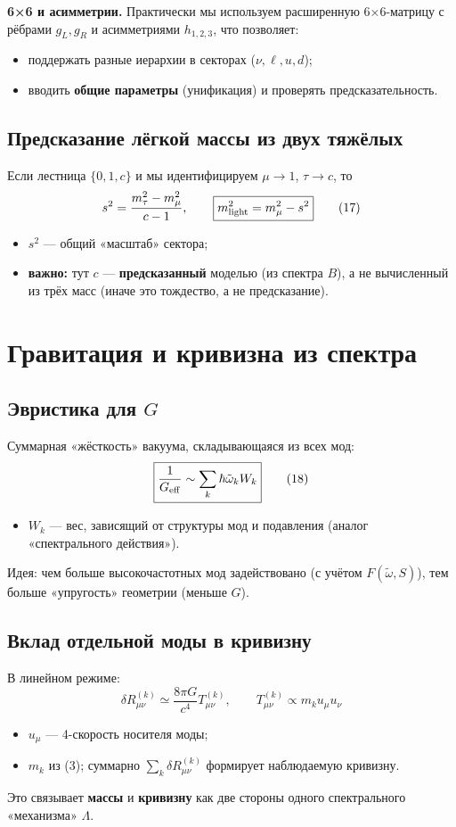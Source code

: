 \documentclass[12pt,a4paper]{article}
\begin{document}
\textbf{6×6 и асимметрии.} Практически мы используем расширенную 6×6-матрицу с рёбрами \(g_L, g_R\) и асимметриями \(h_{1,2,3}\), что позволяет:
\begin{itemize}
    \item поддержать разные иерархии в секторах (\(\nu, \ell, u, d\));
    \item вводить \textbf{общие параметры} (унификация) и проверять предсказательность.
\end{itemize}

\subsection{Предсказание лёгкой массы из двух тяжёлых}
Если лестница \(\{0, 1, c\}\) и мы идентифицируем \(\mu \to 1\), \(\tau \to c\), то
\[
s^2 = \frac{m_\tau^2 - m_\mu^2}{c - 1}, \qquad
\boxed{m_{\rm light}^2 = m_\mu^2 - s^2} \tag{17}
\]
\begin{itemize}
    \item \(s^2\) — общий «масштаб» сектора;
    \item \textbf{важно:} тут \(c\) — \textbf{предсказанный} моделью (из спектра \(B\)), а не вычисленный из трёх масс (иначе это тождество, а не предсказание).
\end{itemize}

\section{Гравитация и кривизна из спектра}

\subsection{Эвристика для \(G\)}
Суммарная «жёсткость» вакуума, складывающаяся из всех мод:
\[
\boxed{\frac{1}{G_{\rm eff}} \sim \sum_k \hbar \tilde{\omega}_k W_k} \tag{18}
\]
\begin{itemize}
    \item \(W_k\) — вес, зависящий от структуры мод и подавления (аналог «спектрального действия»).
\end{itemize}
Идея: чем больше высокочастотных мод задействовано (с учётом \(F(\tilde{\omega}, S)\)), тем больше «упругость» геометрии (меньше \(G\)).

\subsection{Вклад отдельной моды в кривизну}
В линейном режиме:
\[
\boxed{
\delta R_{\mu\nu}^{(k)} \simeq \frac{8\pi G}{c^4} T_{\mu\nu}^{(k)}, \qquad
T_{\mu\nu}^{(k)} \propto m_k u_\mu u_\nu
} \tag{19}
\]
\begin{itemize}
    \item \(u_\mu\) — 4-скорость носителя моды;
    \item \(m_k\) из (3); суммарно \(\sum_k \delta R_{\mu\nu}^{(k)}\) формирует наблюдаемую кривизну.
\end{itemize}
Это связывает \textbf{массы} и \textbf{кривизну} как две стороны одного спектрального «механизма» \(\Lambda\).
\end{document}

